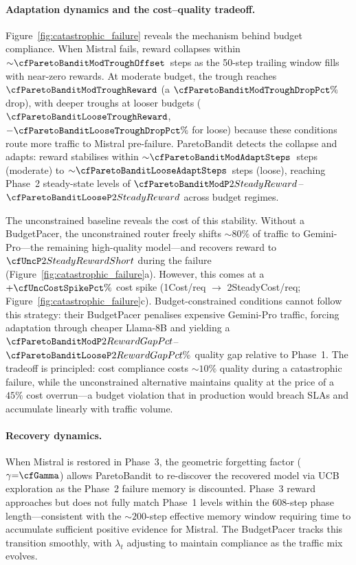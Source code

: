 \paragraph{Adaptation dynamics and the cost--quality tradeoff.}
Figure~\ref{fig:catastrophic_failure} reveals the mechanism behind budget compliance.
When Mistral fails, reward collapses within ${\sim}\cfParetoBanditModTroughOffset$~steps as the 50-step trailing window fills with near-zero rewards.
At moderate budget, the trough reaches $\cfParetoBanditModTroughReward$ (a $\cfParetoBanditModTroughDropPct\%$ drop), with deeper troughs at looser budgets ($\cfParetoBanditLooseTroughReward$, $-\cfParetoBanditLooseTroughDropPct\%$ for loose) because these conditions route more traffic to Mistral pre-failure.
ParetoBandit detects the collapse and adapts: reward stabilises within ${\sim}\cfParetoBanditModAdaptSteps$~steps (moderate) to ${\sim}\cfParetoBanditLooseAdaptSteps$~steps (loose), reaching Phase~2 steady-state levels of $\cfParetoBanditModP2SteadyReward$--$\cfParetoBanditLooseP2SteadyReward$ across budget regimes.

The unconstrained baseline reveals the cost of this stability.
Without a BudgetPacer, the unconstrained router freely shifts ${\sim}80\%$ of traffic to Gemini-Pro---the remaining high-quality model---and recovers reward to $\cfUncP2SteadyRewardShort$ during the failure (Figure~\ref{fig:catastrophic_failure}a).
However, this comes at a $+\cfUncCostSpikePct\%$ cost spike (\cfUncP1Cost/req $\to$ \cfUncP2SteadyCost/req; Figure~\ref{fig:catastrophic_failure}c).
Budget-constrained conditions cannot follow this strategy: their BudgetPacer penalises expensive Gemini-Pro traffic, forcing adaptation through cheaper Llama-8B and yielding a $\cfParetoBanditModP2RewardGapPct$--$\cfParetoBanditLooseP2RewardGapPct\%$ quality gap relative to Phase~1.
The tradeoff is principled: cost compliance costs ${\sim}10\%$ quality during a catastrophic failure, while the unconstrained alternative maintains quality at the price of a $45\%$ cost overrun---a budget violation that in production would breach SLAs and accumulate linearly with traffic volume.

\paragraph{Recovery dynamics.}
When Mistral is restored in Phase~3, the geometric forgetting factor ($\gamma{=}\cfGamma$) allows ParetoBandit to re-discover the recovered model via UCB exploration as the Phase~2 failure memory is discounted.
Phase~3 reward approaches but does not fully match Phase~1 levels within the 608-step phase length---consistent with the ${\sim}200$-step effective memory window requiring time to accumulate sufficient positive evidence for Mistral.
The BudgetPacer tracks this transition smoothly, with $\lambda_t$ adjusting to maintain compliance as the traffic mix evolves.

